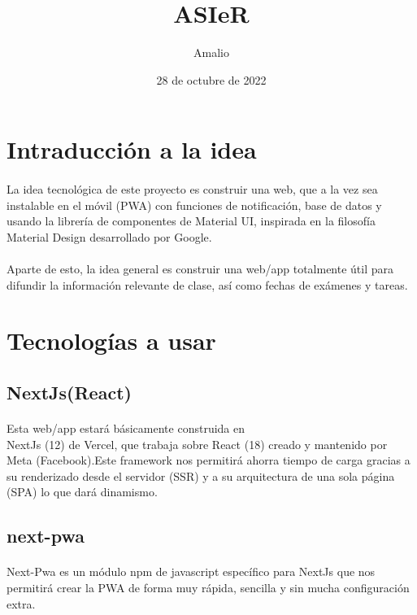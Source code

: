 \documentclass[a4paper]{article}
\title{ASIeR}
\author{Amalio}
\date{28 de octubre de 2022}
\begin{document}
\maketitle
\tableofcontents
\section[Idea]{Intraducción a la idea}
\paragraph{}
La idea tecnológica de este proyecto es construir una web,
que a la vez sea instalable en el móvil (PWA) con funciones de notificación,
base de datos y usando la librería de componentes de Material UI, inspirada en la filosofía
Material Design desarrollado por Google.
\paragraph{}
Aparte de esto, la idea general es construir una web/app
totalmente útil para difundir la información relevante de clase,
así como fechas de exámenes y tareas.
\section[Tecnologías]{Tecnologías a usar}
\subsection[Next Js]{NextJs(React)}
\paragraph{}
Esta web/app estará básicamente construida en\\ NextJs (12)
de Vercel, que trabaja sobre React (18)
creado y mantenido por Meta (Facebook).Este
framework nos permitirá ahorra tiempo de carga gracias a su
renderizado desde el servidor (SSR) y a su arquitectura de
una sola página (SPA) lo que dará dinamismo.
\subsection[Next-PWA]{next-pwa}
\paragraph{}
Next-Pwa es un módulo npm de javascript específico para NextJs que nos
permitirá crear la PWA de forma muy rápida, sencilla y sin mucha configuración extra.
\end{document}
